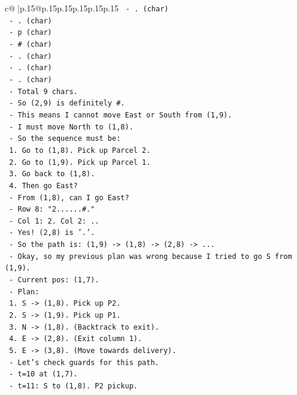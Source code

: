 \documentclass{article}
\begin{document}
{\begin{supertabular}{c@{$\;$}|p{.15\linewidth}@{}p{.15\linewidth}p{.15\linewidth}p{.15\linewidth}p{.15\linewidth}p{.15\linewidth}}
{{{\texttt{   {-} . (char)} \\
\texttt{   {-} . (char)} \\
\texttt{   {-} p (char)} \\
\texttt{   {-} \# (char)} \\
\texttt{   {-} . (char)} \\
\texttt{   {-} . (char)} \\
\texttt{   {-} . (char)} \\
\texttt{   {-} Total 9 chars.} \\
\texttt{   {-} So (2,9) is definitely \#.} \\
\texttt{   {-} This means I cannot move East or South from (1,9).} \\
\texttt{   {-} I must move North to (1,8).} \\
\texttt{   {-} So the sequence must be:} \\
\texttt{     1. Go to (1,8). Pick up Parcel 2.} \\
\texttt{     2. Go to (1,9). Pick up Parcel 1.} \\
\texttt{     3. Go back to (1,8).} \\
\texttt{     4. Then go East?} \\
\texttt{     {-} From (1,8), can I go East?} \\
\texttt{     {-} Row 8: "2......\#."} \\
\texttt{     {-} Col 1: 2. Col 2: ..} \\
\texttt{     {-} Yes! (2,8) is '.'.} \\
\texttt{     {-} So the path is: (1,9) {-}> (1,8) {-}> (2,8) {-}> ...} \\
\texttt{   {-} Okay, so my previous plan was wrong because I tried to go S from (1,9).} \\
\texttt{   {-} Current pos: (1,7).} \\
\texttt{   {-} Plan:} \\
\texttt{     1. S {-}> (1,8). Pick up P2.} \\
\texttt{     2. S {-}> (1,9). Pick up P1.} \\
\texttt{     3. N {-}> (1,8). (Backtrack to exit).} \\
\texttt{     4. E {-}> (2,8). (Exit column 1).} \\
\texttt{     5. E {-}> (3,8). (Move towards delivery).} \\
\texttt{   {-} Let's check guards for this path.} \\
\texttt{   {-} t=10 at (1,7).} \\
\texttt{   {-} t=11: S to (1,8). P2 pickup.} \\
}}}
\end{supertabular}}
\end{document}
